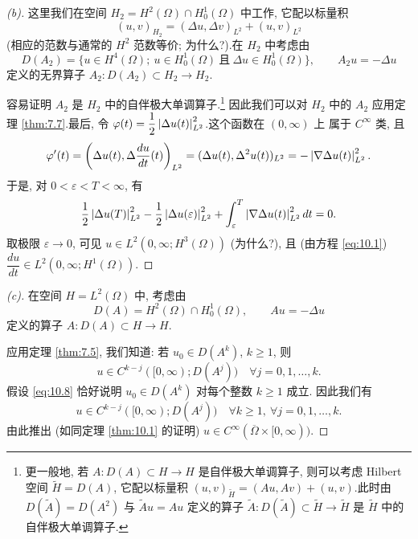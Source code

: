 \begin{proof}[(b)]
这里我们在空间 $H_2=H^2(\Omega)\cap H_0^1(\Omega)$ 中工作, 它配以标量积
\begin{equation*}
(u,v)_{H_2}=(\Delta u,\Delta v)_{L^2}+(u,v)_{L^2}
\end{equation*}
(相应的范数与通常的 $H^2$ 范数等价; 为什么?).在 $H_2$ 中考虑由
\begin{equation*}
D(A_2)=\{u\in H^4(\Omega);\ u\in H_0^1(\Omega)\ \text{且}\
\Delta u\in H_0^1(\Omega)\},\qquad A_2u=-\Delta u
\end{equation*}
定义的无界算子 $A_2:D(A_2)\subset H_2\to H_2$.

容易证明 $A_2$ 是 $H_2$ 中的自伴极大单调算子.\footnote{更一般地, 若
$A:D(A)\subset H\to H$ 是自伴极大单调算子, 则可以考虑 Hilbert 空间
$\tilde H=D(A)$, 它配以标量积
$(u,v)_{\tilde H}=(Au,Av)+(u,v)$.此时由 $D(\tilde A)=D(A^2)$ 与
$\tilde Au=Au$ 定义的算子 $\tilde A:D(\tilde A)\subset\tilde H\to\tilde H$
是 $\tilde H$ 中的自伴极大单调算子.} 因此我们可以对 $H_2$ 中的 $A_2$
应用定理  \ref{thm:7.7}.最后, 令
$\varphi(t)=\dfrac12\left|\Delta u(t)\right|^2_{L^2}$.这个函数在 $(0,\infty)$ 上
属于 $C^\infty$ 类, 且
\begin{equation*}
\varphi'(t)=\left(\Delta u(t),\Delta\frac{du}{dt}(t)\right)_{L^2}
=(\Delta u(t),\Delta^2u(t))_{L^2}=-\left|\nabla\Delta u(t)\right|^2_{L^2}.
\end{equation*}
于是, 对 $0<\varepsilon<T<\infty$, 有
\begin{equation*}
\frac12\left|\Delta u(T)\right|^2_{L^2}-\frac12\left|\Delta u(\varepsilon)\right|^2_{L^2}
+\int_\varepsilon^T\left|\nabla\Delta u(t)\right|^2_{L^2}dt=0.
\end{equation*}
取极限 $\varepsilon\to0$, 可见 $u\in L^2(0,\infty;H^3(\Omega))$ (为什么?),
且 (由方程 \eqref{eq:10.1}) $\dfrac{du}{dt}\in L^2(0,\infty;H^1(\Omega))$.
\end{proof}

\begin{proof}[(c)]
在空间 $H=L^2(\Omega)$ 中, 考虑由
\begin{equation*}
D(A)=H^2(\Omega)\cap H_0^1(\Omega),\qquad Au=-\Delta u
\end{equation*}
定义的算子 $A:D(A)\subset H\to H$.

应用定理  \ref{thm:7.5}, 我们知道: 若 $u_0\in D(A^k)$, $k\ge1$, 则
\begin{equation*}
u\in C^{k-j}([0,\infty);D(A^j))\quad\forall j=0,1,\dots,k.
\end{equation*}
假设 \eqref{eq:10.8} 恰好说明 $u_0\in D(A^k)$ 对每个整数 $k\ge1$ 成立.
因此我们有
\begin{equation*}
u\in C^{k-j}([0,\infty);D(A^j))\quad\forall k\ge1,\
\forall j=0,1,\dots,k.
\end{equation*}
由此推出 (如同定理  \ref{thm:10.1} 的证明)
$u\in C^\infty(\overline\Omega\times[0,\infty))$.
\end{proof}


